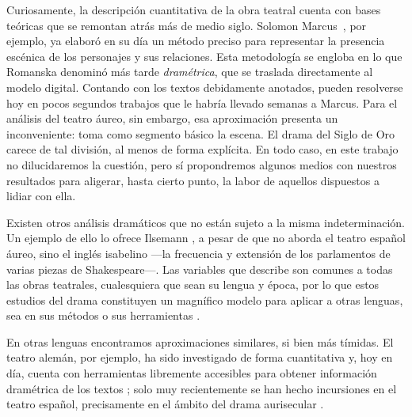 Curiosamente, la descripción cuantitativa de la obra teatral cuenta con bases teóricas que se remontan atrás más de medio siglo. Solomon Marcus~\parencite*{marcus1973}, por ejemplo, ya elaboró en su día un método preciso para representar la presencia escénica de los personajes y sus relaciones. Esta metodología se engloba en lo que Romanska \parencite*[446]{romanska2015} denominó más tarde \textit{dramétrica}, que se traslada directamente al modelo digital. Contando con los textos debidamente anotados, pueden resolverse hoy en pocos segundos trabajos que le habría llevado semanas a Marcus. Para el análisis del teatro áureo, sin embargo, esa aproximación presenta un inconveniente: toma como segmento básico la escena. El drama del Siglo de Oro carece de tal división, al menos de forma explícita. En todo caso, en este trabajo no dilucidaremos la cuestión, pero sí propondremos algunos medios con nuestros resultados para aligerar, hasta cierto punto, la labor de aquellos dispuestos a lidiar con ella.

Existen otros análisis dramáticos que no están sujeto a la misma indeterminación. Un ejemplo de ello lo ofrece Ilsemann \parencite*{ilsemann1998}, a pesar de que no aborda el teatro español áureo, sino el inglés isabelino —\nolinebreak la frecuencia y extensión de los parlamentos de varias piezas de Shakespeare\nolinebreak—\nolinebreak. Las variables que describe son comunes a todas las obras teatrales, cualesquiera que sean su lengua y época, por lo que estos estudios del drama constituyen un magnífico modelo para aplicar a otras lenguas, sea en sus métodos \parencite{ilsemann2013} o sus herramientas \parencite{wilhelm2013}.

 En otras lenguas encontramos aproximaciones similares, si bien más tímidas. El teatro alemán, por ejemplo, ha sido investigado de forma cuantitativa \parencite{dennerlein2015} y, hoy en día, cuenta con herramientas libremente accesibles para obtener información dramétrica de los textos \parencite{schmidt2019}; solo muy recientemente se han hecho incursiones en el teatro español, precisamente en el ámbito del drama aurisecular \parencites{ehrlicher2020}{lehmann2022}.


